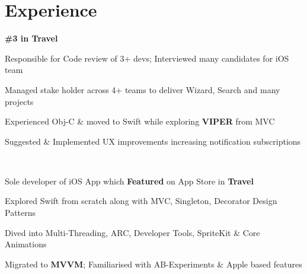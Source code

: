 \documentclass[]{Kauts}
\begin{document}
\hfill
\begin{minipage}[t]{0.69\textwidth} 


\section{Experience}
 \hfill \textbf{\#3 in Travel}\\
\vspace{\topsep}
\begin{tightemize}
\item Responsible for Code review of 3+ devs; Interviewed many candidates for iOS team\\
\item Managed stake holder across 4+ teams to deliver Wizard, Search and many projects\\
\item Experienced Obj-C \& moved to Swift while exploring \textbf{VIPER} from MVC\\
\item Suggested \& Implemented UX improvements increasing notification subscriptions\\
\end{tightemize}
\sectionsep

\\
\begin{tightemize}
\item Sole developer of iOS App which \textbf{Featured} on App Store in \textbf{Travel}\\
\item Explored Swift from scratch along with MVC, Singleton, Decorator Design Patterns\\
\item Dived into Multi-Threading, ARC, Developer Tools, SpriteKit \& Core Animations\\
\item Migrated to \textbf{MVVM}; Familiarised with AB-Experiments \& Apple based features\\
\end{tightemize}
\sectionsep


\end{minipage}
\end{document}
